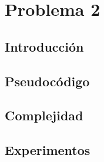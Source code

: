 \section{Problema 2}

\subsection{Introducción}
\subsection{Pseudocódigo}
\subsection{Complejidad}
\subsection{Experimentos}